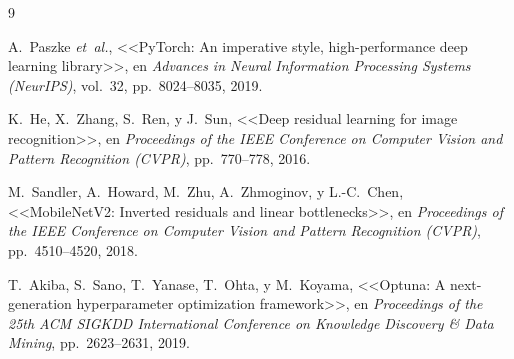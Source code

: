 \documentclass[11pt,a4paper]{article}
\begin{document}
\FloatBarrier
\begin{thebibliography}{9}

A.~Paszke \textit{et~al.}, <<PyTorch: An imperative style, high-performance deep learning library>>, en \textit{Advances in Neural Information Processing Systems (NeurIPS)}, vol.~32, pp.~8024--8035, 2019.

K.~He, X.~Zhang, S.~Ren, y J.~Sun, <<Deep residual learning for image recognition>>, en \textit{Proceedings of the IEEE Conference on Computer Vision and Pattern Recognition (CVPR)}, pp.~770--778, 2016.

M.~Sandler, A.~Howard, M.~Zhu, A.~Zhmoginov, y L.-C.~Chen, <<MobileNetV2: Inverted residuals and linear bottlenecks>>, en \textit{Proceedings of the IEEE Conference on Computer Vision and Pattern Recognition (CVPR)}, pp.~4510--4520, 2018.

T.~Akiba, S.~Sano, T.~Yanase, T.~Ohta, y M.~Koyama, <<Optuna: A next-generation hyperparameter optimization framework>>, en \textit{Proceedings of the 25th ACM SIGKDD International Conference on Knowledge Discovery \& Data Mining}, pp.~2623--2631, 2019.

\end{thebibliography}
\end{document}
